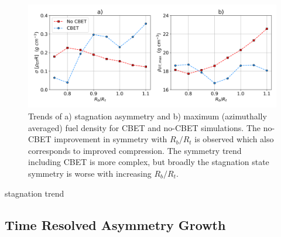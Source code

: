 \begin{figure}[t!]
    \includegraphics[width=1.0\linewidth]{Results1/Images/RbRt_sig_rhomax.png}
    \centering
    \caption{Trends of a) stagnation asymmetry and b) maximum (azimuthally averaged) fuel density for \ac{CBET} and no-\ac{CBET} simulations.
    The no-\ac{CBET} improvement in symmetry with $R_b/R_t$ is observed which also corresponds to improved compression.
    The symmetry trend including \ac{CBET} is more complex, but broadly the stagnation state symmetry is worse with increasing $R_b/R_t$.}%
    \label{fig:Res1_asymm_trend}
\end{figure}

stagnation trend


\subsection{Time Resolved Asymmetry Growth}%
\label{sec:Res1_time_res_growth}

